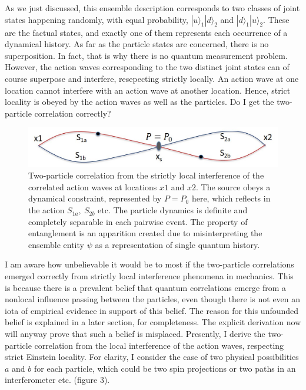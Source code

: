 As we just discussed, this ensemble description corresponds to two classes of joint states
happening randomly, with equal probability, $|u \rangle_1 |d \rangle_2$ and $|d \rangle_1 |u \rangle_2$. These are the factual
states, and exactly one of them represents each occurrence of a dynamical history. As far
as the particle states are concerned, there is no superposition. In fact, that is why there
is no quantum measurement problem. However, the action waves corresponding to the two
distinct joint states can of course superpose and interfere, resepecting strictly locally. An
action wave at one location cannot interfere with an action wave at another location. Hence,
strict locality is obeyed by the action waves as well as the particles. Do I get the two-particle
correlation correctly?
\begin{figure}[H]
\centering
\includegraphics[scale=0.55]{src/images/chap27/3.jpg}
\caption{Two-particle correlation from the strictly local interference of the correlated action waves at
locations $x1$ and $x2$. The source obeys a dynamical constraint, represented by $P = P_0$ here, which
reflects in the action $S_{1a}, ~S_{2b}$ etc. The particle dynamics is definite and completely separable in
each pairwise event. The property of entanglement is an apparition created due to misinterpreting
the ensemble entity $\psi$ as a representation of single quantum history.}\label{ch14-fig3}
\end{figure}

I am aware how unbelievable it would be to most if the two-particle correlations emerged
correctly from strictly local interference phenomena in mechanics. This is because there is a
prevalent belief that quantum correlations emerge from a nonlocal influence passing between
the particles, even though there is not even an iota of empirical evidence in support of this
belief. The reason for this unfounded belief is explained in a later section, for completeness.
The explicit derivation now will anyway prove that such a belief is misplaced. Presently, I
derive the two-particle correlation from the local interference of the action waves, respecting
strict Einstein locality. For clarity, I consider the case of two physical possibilities $a$ and $b$
for each particle, which could be two spin projections or two paths in an interferometer etc.
(figure 3).

